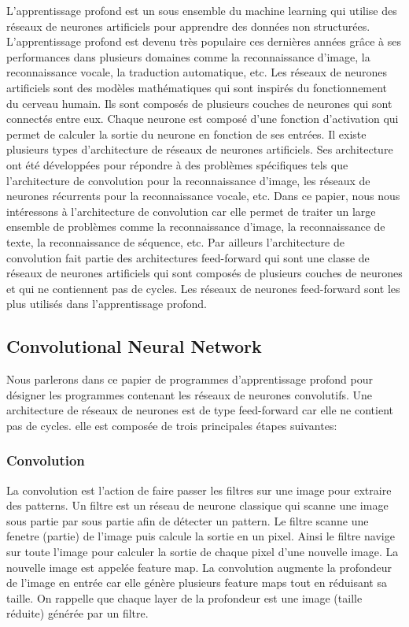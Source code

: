 \label{sec:introduction}

L'apprentissage profond est un sous ensemble du machine learning qui utilise des
réseaux de neurones artificiels pour apprendre des données non structurées.
L'apprentissage profond est devenu très populaire ces dernières années grâce à
ses performances dans plusieurs domaines comme la reconnaissance d'image, la
reconnaissance vocale, la traduction automatique, etc. Les réseaux de neurones
artificiels sont des modèles mathématiques qui sont inspirés du fonctionnement
du cerveau humain. Ils sont composés de plusieurs couches de neurones qui sont
connectés entre eux. Chaque neurone est composé d'une fonction d'activation qui
permet de calculer la sortie du neurone en fonction de ses entrées. Il existe
plusieurs types d'architecture de réseaux de neurones artificiels. Ses
architecture ont été développées pour répondre à des problèmes spécifiques tels
que l'architecture de convolution pour la reconnaissance d'image, les réseaux de
neurones récurrents pour la reconnaissance vocale, etc. Dans ce papier, nous
nous intéressons à l'architecture de convolution car elle permet de traiter un
large ensemble de problèmes comme la reconnaissance d'image, la reconnaissance
de texte, la reconnaissance de séquence, etc. Par ailleurs l'architecture de
convolution fait partie des architectures feed-forward qui sont une classe de
réseaux de neurones artificiels qui sont composés de plusieurs couches de
neurones  et qui ne contiennent pas de cycles. Les réseaux de neurones
feed-forward sont les plus utilisés dans l'apprentissage profond.\\


\subsection{Convolutional Neural Network}
Nous parlerons dans ce papier de programmes d'apprentissage profond pour
désigner les programmes contenant les réseaux de neurones convolutifs. Une
architecture de réseaux de neurones est de type feed-forward car elle ne
contient pas de cycles. elle est composée de trois principales étapes suivantes:\\

\subsubsection*{Convolution}
La convolution est l'action de faire passer les filtres sur une image pour
extraire des patterns. Un filtre est un réseau de neurone classique qui scanne
une image sous partie par sous partie afin de détecter un pattern. Le filtre
scanne une fenetre (partie) de l'image puis calcule la sortie en un pixel. Ainsi
le filtre navige sur toute l'image pour calculer la sortie de chaque pixel d'une nouvelle image.
La nouvelle image est appelée feature map. La convolution augmente la profondeur de
l'image en entrée car elle génère plusieurs feature maps tout en réduisant sa taille.
On rappelle que chaque layer de la profondeur est une image (taille réduite)
générée par un filtre.\\

